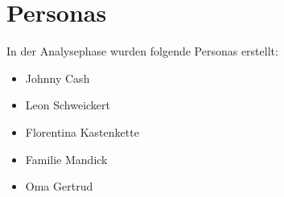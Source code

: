 \section{Personas}

In der Analysephase wurden folgende Personas erstellt:
\begin{itemize}
\item Johnny Cash
\item Leon Schweickert
\item Florentina Kastenkette
\item Familie Mandick
\item Oma Gertrud
\end{itemize}